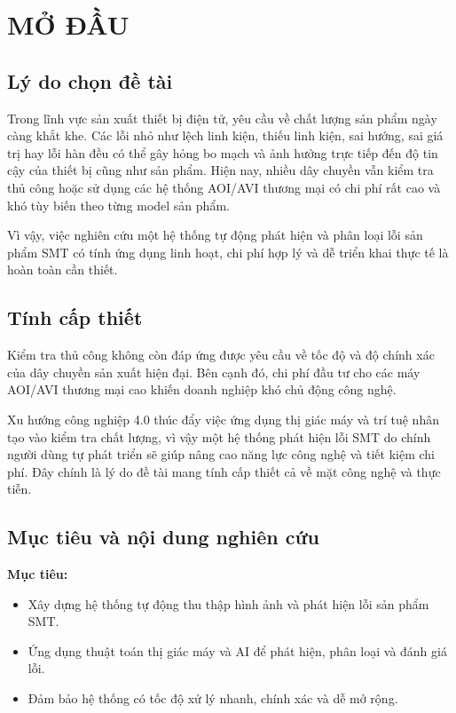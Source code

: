\chapter*{MỞ ĐẦU}

\section*{Lý do chọn đề tài}
Trong lĩnh vực sản xuất thiết bị điện tử, yêu cầu về chất lượng sản phẩm ngày càng khắt khe. 
Các lỗi nhỏ như lệch linh kiện, thiếu linh kiện, sai hướng, sai giá trị hay lỗi hàn đều có thể gây hỏng bo mạch và ảnh hưởng trực tiếp đến độ tin cậy của thiết bị cũng như sản phẩm. 
Hiện nay, nhiều dây chuyền vẫn kiểm tra thủ công hoặc sử dụng các hệ thống AOI/AVI thương mại có chi phí rất cao và khó tùy biến theo từng model sản phẩm. 

Vì vậy, việc nghiên cứu một hệ thống tự động phát hiện và phân loại lỗi sản phẩm SMT có tính ứng dụng linh hoạt, chi phí hợp lý và dễ triển khai thực tế là hoàn toàn cần thiết.

\section*{Tính cấp thiết}
Kiểm tra thủ công không còn đáp ứng được yêu cầu về tốc độ và độ chính xác của dây chuyền sản xuất hiện đại. Bên cạnh đó, chi phí đầu tư cho các máy AOI/AVI thương mại cao khiến doanh nghiệp khó chủ động công nghệ. 

Xu hướng công nghiệp 4.0 thúc đẩy việc ứng dụng thị giác máy và trí tuệ nhân tạo vào kiểm tra chất lượng, vì vậy một hệ thống phát hiện lỗi SMT do chính người dùng tự phát triển sẽ giúp nâng cao năng lực công nghệ và tiết kiệm chi phí. Đây chính là lý do đề tài mang tính cấp thiết cả về mặt công nghệ và thực tiễn.

\section*{Mục tiêu và nội dung nghiên cứu}
\textbf{Mục tiêu:}
\begin{itemize}
    \item Xây dựng hệ thống tự động thu thập hình ảnh và phát hiện lỗi sản phẩm SMT.
    \item Ứng dụng thuật toán thị giác máy và AI để phát hiện, phân loại và đánh giá lỗi.
    \item Đảm bảo hệ thống có tốc độ xử lý nhanh, chính xác và dễ mở rộng.
\end{itemize}

